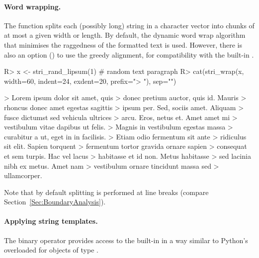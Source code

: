 \documentclass[nojss]{jss}\usepackage[]{graphicx}\usepackage[]{color}
\begin{document}
\paragraph{Word wrapping.}
The  function splits each (possibly long)
string in a character vector into chunks of at most a given width or length.
By default, the dynamic word wrap algorithm \citep{Knuth:wrap}
that minimises the raggedness of the formatted text is used.
However, there is also an option ()
to use the greedy alignment,
for compatibility with the built-in .

\begin{Schunk}
\begin{Sinput}
R> x <- stri_rand_lipsum(1)  # random text paragraph
R> cat(stri_wrap(x, width=60, indent=24, exdent=20, prefix="> "), sep="\n")
\end{Sinput}
\begin{Soutput}
>                         Lorem ipsum dolor sit amet, quis
>                     donec pretium auctor, quis id. Mauris
>                     rhoncus donec amet egestas sagittis
>                     ipsum per. Sed, sociis amet. Aliquam
>                     fusce dictumst sed vehicula ultrices
>                     arcu. Eros, netus et. Amet amet mi
>                     vestibulum vitae dapibus ut felis.
>                     Magnis in vestibulum egestas massa
>                     curabitur a ut, eget in in facilisis.
>                     Etiam odio fermentum sit ante
>                     ridiculus sit elit. Sapien torquent
>                     fermentum tortor gravida ornare sapien
>                     consequat et sem turpis. Hac vel lacus
>                     habitasse et id non. Metus habitasse
>                     sed lacinia nibh ex metus. Amet nam
>                     vestibulum ornare tincidunt massa sed
>                     ullamcorper.
\end{Soutput}
\end{Schunk}

Note that by default splitting is performed at line breaks
(compare Section~\ref{Sec:BoundaryAnalysis}).






\paragraph{Applying string templates.}
The binary operator  provides access to the built-in
 in a way similar to Python's \code{\%} overloaded
for objects of type .
\end{document}
